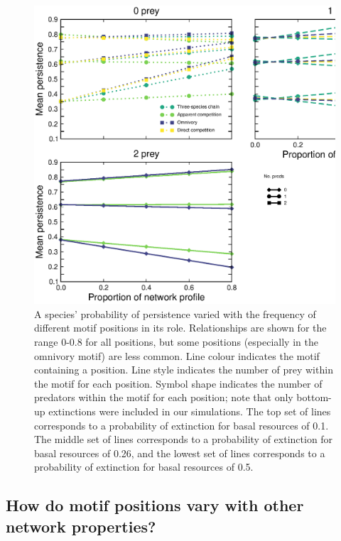 \documentclass[12pt]{article}
\begin{document}
\begin{spacing}{2.0}
        
        \begin{figure}
            \centering
            \includegraphics[width=.95\textwidth]{figures/persistence_positions_byprey.eps}
            \caption{A species' probability of persistence varied with the frequency of different motif positions in its role. Relationships are shown for the range 0-0.8 for all positions, but some positions (especially in the omnivory motif) are less common. Line colour indicates the motif containing a position. Line style indicates the number of prey within the motif for each position. Symbol shape indicates the number of predators within the motif for each position; note that only bottom-up extinctions were included in our simulations. The top set of lines corresponds to a probability of extinction for basal resources of 0.1. The middle set of lines corresponds to a probability of extinction for basal resources of 0.26, and the lowest set of lines corresponds to a probability of extinction for basal resources of 0.5.}
            \label{fig:persistence_positions_prey}
        \end{figure}
        
        
    \subsection*{How do motif positions vary with other network properties?}    
    

\end{spacing}
\end{document}
